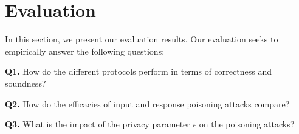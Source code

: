 \section{Evaluation}\label{chap4-sec:eval}

In this section, we present our evaluation results. Our evaluation seeks to empirically answer the following questions:
\squishlist
    \item \textbf{Q1.} How do the different protocols perform in terms of correctness and soundness?
    \item \textbf{Q2.} How do the efficacies of input and response poisoning attacks compare?
    \item \textbf{Q3.} What is the impact of the privacy parameter $\epsilon$ on the poisoning attacks?
\squishend
